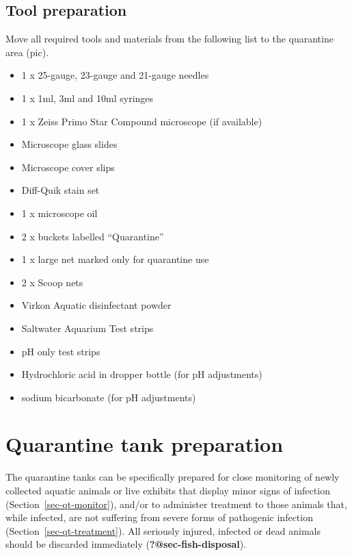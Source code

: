 \documentclass[
  12pt,
]{report}
\providecommand{\tightlist}{%
  \setlength{\itemsep}{0pt}\setlength{\parskip}{0pt}}\usepackage{longtable,booktabs,array}
\begin{document}
\hypertarget{sec-quarantine-tool}{%
\subsection{Tool preparation}\label{sec-quarantine-tool}}

Move all required tools and materials from the following list to the
quarantine area (pic).

\begin{itemize}
\tightlist
\item
  1 x 25-gauge, 23-gauge and 21-gauge needles
\item
  1 x 1ml, 3ml and 10ml syringes
\item
  1 x Zeiss Primo Star Compound microscope (if available)
\item
  Microscope glass slides
\item
  Microscope cover slips
\item
  Diff-Quik stain set
\item
  1 x microscope oil
\item
  2 x buckets labelled ``Quarantine''
\item
  1 x large net marked only for quarantine use
\item
  2 x Scoop nets
\item
  Virkon Aquatic disinfectant powder
\item
  Saltwater Aquarium Test strips
\item
  pH only test strips
\item
  Hydrochloric acid in dropper bottle (for pH adjustments)
\item
  sodium bicarbonate (for pH adjustments)
\end{itemize}

\hypertarget{sec-qt-prep}{%
\section{Quarantine tank preparation}\label{sec-qt-prep}}

The quarantine tanks can be specifically prepared for close monitoring
of newly collected aquatic animals or live exhibits that display minor
signs of infection (Section~\ref{sec-qt-monitor}), and/or to administer
treatment to those animals that, while infected, are not suffering from
severe forms of pathogenic infection (Section~\ref{sec-qt-treatment}).
All seriously injured, infected or dead animals should be discarded
immediately (\textbf{?@sec-fish-disposal}).
\end{document}

